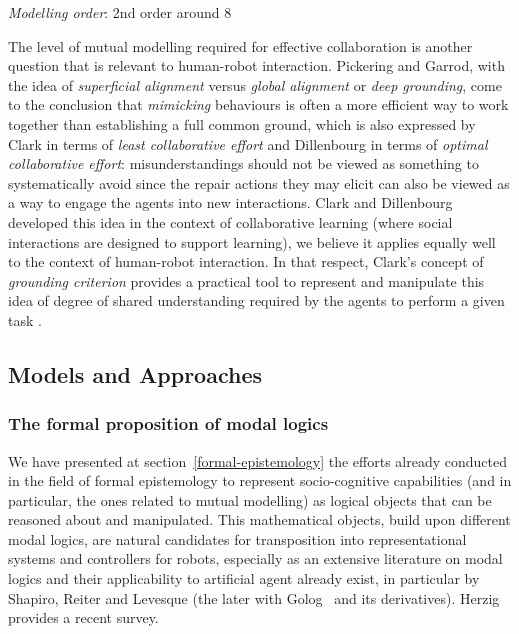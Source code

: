 \documentclass{sig-alternate}
\begin{document}
\emph{Modelling order}: 2nd order around 8~\cite{perner1988higher}

The level of mutual modelling required for effective collaboration is another
question that is relevant to human-robot interaction. Pickering and Garrod, with
the idea of \emph{superficial alignment} versus \emph{global alignment} or
\emph{deep grounding}, come to the conclusion that \emph{mimicking} behaviours
is often a more efficient way to work together than establishing a full common
ground, which is also expressed by Clark in terms of \emph{least collaborative
effort} and Dillenbourg in terms of \emph{optimal collaborative effort}:
misunderstandings should not be viewed as something to systematically avoid
since the repair actions they may elicit can also be viewed as a way to engage
the agents into new interactions. Clark and Dillenbourg developed this idea in
the context of collaborative learning (where social interactions are designed to
support learning), we believe it applies equally well to the context of
human-robot interaction.  In that respect, Clark's concept of \emph{grounding
criterion} provides a practical tool to represent and manipulate this idea of
degree of shared understanding required by the agents to perform a given task .


\subsection{Models and Approaches}

\subsubsection{The formal proposition of modal logics}

We have presented at section~\ref{formal-epistemology} the efforts already
conducted in the field of formal epistemology to represent socio-cognitive
capabilities (and in particular, the ones related to mutual modelling) as
logical objects that can be reasoned about and manipulated. This mathematical
objects, build upon different modal logics, are natural candidates for
transposition into representational systems and controllers for robots,
especially as an extensive literature on modal logics and their applicability to
artificial agent already exist, in particular by Shapiro, Reiter and Levesque
(the later with Golog~\cite{levesque1997golog} and its derivatives).
Herzig~\cite{herzig2014logics} provides a recent survey.
\end{document}
